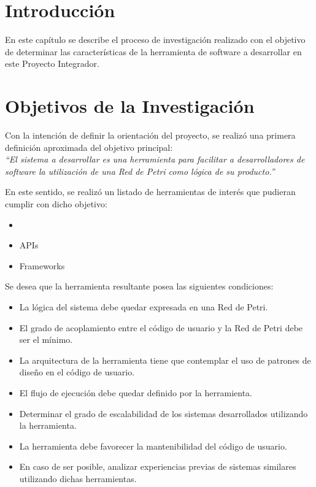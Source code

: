 \section{Introducción}
En este capítulo se describe el proceso de investigación realizado con el
objetivo de determinar las características de la herramienta de software a
desarrollar en este Proyecto Integrador.

\section{Objetivos de la Investigación}
Con la intención de definir la orientación del proyecto, se realizó
una primera definición aproximada del objetivo principal:\\
\emph{``El sistema a desarrollar es una herramienta para facilitar a
desarrolladores de software la utilización de una Red de Petri como lógica de su
producto.''}

En este sentido, se realizó un listado de herramientas de interés que pudieran
cumplir con dicho objetivo:
\begin{itemize}
  \item 
  \item APIs
  \item Frameworks
\end{itemize}

Se desea que la herramienta resultante posea las siguientes condiciones:
\begin{itemize}
    \item La lógica del sistema debe quedar expresada en una Red de Petri.
    \item El grado de acoplamiento entre el código de usuario
    y la Red de Petri debe ser el mínimo.
    \item La arquitectura de la herramienta tiene que contemplar el uso de
    patrones de diseño en el código de usuario.
    \item El flujo de ejecución debe quedar definido por la herramienta.
    \item Determinar el grado de escalabilidad de los sistemas desarrollados
    utilizando la herramienta.
    \item La herramienta debe favorecer la mantenibilidad del código de usuario.
    \item En caso de ser posible, analizar experiencias previas de sistemas
    similares utilizando dichas herramientas.
\end{itemize}

